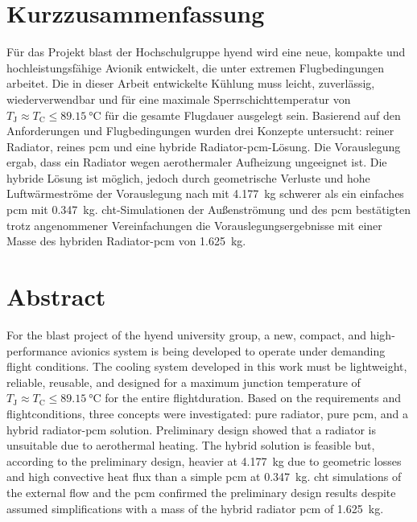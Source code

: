 \chapter*{Kurzzusammenfassung} %
\label{chap:Kurzzusammenfassung}


Für das Projekt \ac{blast} der Hochschulgruppe \ac{hyend} wird eine neue, kompakte und hochleistungsfähige Avionik entwickelt,
die unter extremen Flugbedingungen arbeitet. Die in dieser Arbeit entwickelte Kühlung muss leicht, zuverlässig, wiederverwendbar und für eine
maximale Sperrschichttemperatur von $T_\mathrm{J} \approx T_\mathrm{C} \leq \SI{89.15}{\celsius}$ für die gesamte Flugdauer ausgelegt sein.
Basierend auf den Anforderungen und Flugbedingungen
wurden drei Konzepte untersucht: reiner Radiator, reines \ac{pcm} und eine hybride Radiator-\ac{pcm}-Lösung. Die Vorauslegung
ergab, dass ein Radiator wegen aerothermaler Aufheizung ungeeignet ist. Die hybride Lösung ist möglich, jedoch durch geometrische
Verluste und hohe Luftwärmeströme der Vorauslegung nach mit \SI{4.177}{\kilogram} schwerer als ein einfaches \ac{pcm}
mit \SI{0.347}{\kilogram}. \ac{cht}-Simulationen der Außenströmung und des \ac{pcm}
bestätigten trotz angenommener Vereinfachungen die Vorauslegungsergebnisse mit einer Masse des hybriden Radiator-\ac{pcm} von \SI{1.625}{\kilogram}.

\chapter*{Abstract} %
\label{chap:Abstract}
For the \ac{blast} project of the \ac{hyend} university group, a new, compact, and high-performance avionics system is being developed to
operate under demanding flight conditions. The cooling system developed in this work must be lightweight, reliable, reusable, and designed for a maximum
junction temperature of $T_\mathrm{J} \approx T_\mathrm{C} \leq \SI{89.15}{\celsius}$ for the entire flightduration.
Based on the requirements and flightconditions, three concepts were investigated: pure radiator, pure \ac{pcm}, and a hybrid radiator-\ac{pcm}
solution. Preliminary design showed that a radiator is unsuitable due to aerothermal heating. The hybrid solution is feasible but, according to
the preliminary design, heavier at \SI{4.177}{\kilogram} due to geometric losses and high convective heat flux than a simple \ac{pcm} at
\SI{0.347}{\kilogram}. \ac{cht} simulations of the external flow and the \ac{pcm} confirmed the preliminary design results despite assumed
simplifications with a mass of the hybrid radiator \ac{pcm} of \SI{1.625}{\kilogram}.